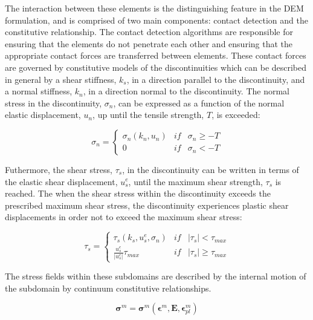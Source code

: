 
The interaction between these elements is the distinguishing feature in the DEM formulation, and is comprised of two main components: contact detection and the constitutive relationship. The contact detection algorithms are responsible for ensuring that the elements do not penetrate each other and ensuring that the appropriate contact forces are transferred between elements. These contact forces are governed by constitutive models of the discontinuities which can be described in general by a shear stiffness, $k_s$, in a direction parallel to the discontinuity, and a normal stiffness, $k_n$, in a direction normal to the discontinuity. The normal stress in the discontinuity, $\sigma_n$, can be expressed as a function of the normal elastic displacement, $u_n$, up until the tensile strength, $T$, is exceeded: 

\begin{equation}
\sigma_n=\left\{\begin{matrix}
\sigma_n\left(k_n, u_n\right) &if&\sigma_n \geq -T\\ 
 0 & if &\sigma_n < -T
\end{matrix}\right.
\label{eqn:demnormal}
\end{equation}

Futhermore, the shear stress, $\tau_s$, in the discontinuity can be written in terms of the elastic shear displacement, $u_s^e$, until the maximum shear strength, $\tau_s$ is reached. The when the shear stress within the discontinuity exceeds the prescribed maximum shear stress, the discontinuity experiences plastic shear displacements in order not to exceed the maximum shear stress:

\begin{equation}
\tau_s=\left\{\begin{matrix}
\tau_s\left(k_s,u_s^e, \sigma_n\right) &if&\left |\tau_{s} \right | < \tau_{max}\\ 
\frac{u_s^e}{\left|u_s^e\right|}\tau_{max} & if &\left |\tau_{s} \right | \geq \tau_{max}
\end{matrix}\right.
\label{eqn:demshear}
\end{equation}

The stress fields within these subdomains are described by the internal motion of the subdomain by continuum constitutive relationships.  

\begin{equation}
\boldsymbol{\sigma}^m = \boldsymbol{\sigma}^m \left(\boldsymbol{\epsilon}^m, \mathbf{E}, \boldsymbol{\epsilon}^m_{pl}\right)
\label{eqn:demcont}
\end{equation}